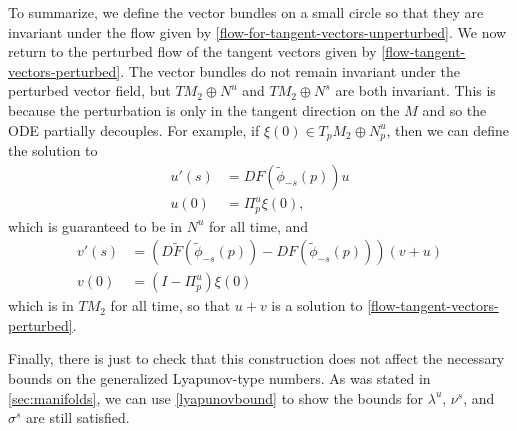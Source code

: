 To summarize, we define the vector bundles on a small circle so that they are invariant under the flow given by \cref{flow-for-tangent-vectors-unperturbed}. We now return to the perturbed flow of the tangent vectors given by \cref{flow-tangent-vectors-perturbed}. The vector bundles do not remain invariant under the perturbed vector field, but \(TM_2 \oplus N^u\) and \(TM_2 \oplus N^s\) are both invariant. This is because the perturbation is only in the tangent direction on the \(M\) and so the ODE partially decouples. For example, if \(\xi(0) \in T_pM_2 \oplus N^u_p\), then we can define the solution to 
\begin{equation}
\begin{aligned}
	u'(s) &= DF(\tilde \phi_{-s}(p)) u\\
	u(0) &= \Pi^u_p \xi(0),
\end{aligned}
\end{equation}
which is guaranteed to be in \(N^u\) for all time, and 
\begin{equation}
\begin{aligned}
	v'(s) &= (D\tilde F(\tilde\phi_{-s}(p)) - DF(\tilde\phi_{-s}(p))) (v + u) \\
	v(0) &= (I - \Pi^u_p) \xi(0)
\end{aligned}
\end{equation}
which is in \(TM_2\) for all time, so that \(u + v\) is a solution to \cref{flow-tangent-vectors-perturbed}.

Finally, there is just to check that this construction does not affect the necessary bounds on the generalized Lyapunov-type numbers. As was stated in \cref{sec:manifolds}, we can use \cref{lyapunovbound} to show the bounds for \(\lambda^u\), \(\nu^s\), and \(\sigma^s\) are still satisfied. 